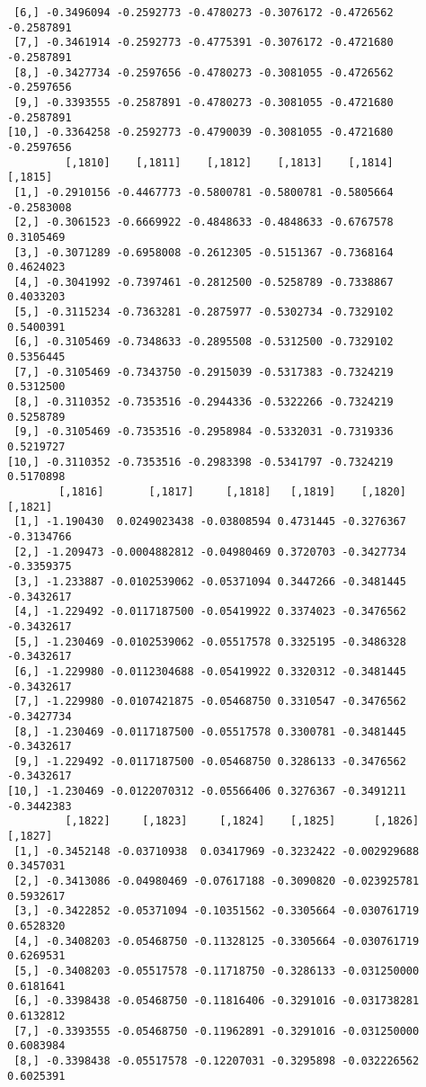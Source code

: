 \documentclass[
  letterpaper,
  DIV=11,
  numbers=noendperiod]{scrreprt}
\begin{document}
\begin{verbatim}
 [6,] -0.3496094 -0.2592773 -0.4780273 -0.3076172 -0.4726562 -0.2587891
 [7,] -0.3461914 -0.2592773 -0.4775391 -0.3076172 -0.4721680 -0.2587891
 [8,] -0.3427734 -0.2597656 -0.4780273 -0.3081055 -0.4726562 -0.2597656
 [9,] -0.3393555 -0.2587891 -0.4780273 -0.3081055 -0.4721680 -0.2587891
[10,] -0.3364258 -0.2592773 -0.4790039 -0.3081055 -0.4721680 -0.2597656
         [,1810]    [,1811]    [,1812]    [,1813]    [,1814]    [,1815]
 [1,] -0.2910156 -0.4467773 -0.5800781 -0.5800781 -0.5805664 -0.2583008
 [2,] -0.3061523 -0.6669922 -0.4848633 -0.4848633 -0.6767578  0.3105469
 [3,] -0.3071289 -0.6958008 -0.2612305 -0.5151367 -0.7368164  0.4624023
 [4,] -0.3041992 -0.7397461 -0.2812500 -0.5258789 -0.7338867  0.4033203
 [5,] -0.3115234 -0.7363281 -0.2875977 -0.5302734 -0.7329102  0.5400391
 [6,] -0.3105469 -0.7348633 -0.2895508 -0.5312500 -0.7329102  0.5356445
 [7,] -0.3105469 -0.7343750 -0.2915039 -0.5317383 -0.7324219  0.5312500
 [8,] -0.3110352 -0.7353516 -0.2944336 -0.5322266 -0.7324219  0.5258789
 [9,] -0.3105469 -0.7353516 -0.2958984 -0.5332031 -0.7319336  0.5219727
[10,] -0.3110352 -0.7353516 -0.2983398 -0.5341797 -0.7324219  0.5170898
        [,1816]       [,1817]     [,1818]   [,1819]    [,1820]    [,1821]
 [1,] -1.190430  0.0249023438 -0.03808594 0.4731445 -0.3276367 -0.3134766
 [2,] -1.209473 -0.0004882812 -0.04980469 0.3720703 -0.3427734 -0.3359375
 [3,] -1.233887 -0.0102539062 -0.05371094 0.3447266 -0.3481445 -0.3432617
 [4,] -1.229492 -0.0117187500 -0.05419922 0.3374023 -0.3476562 -0.3432617
 [5,] -1.230469 -0.0102539062 -0.05517578 0.3325195 -0.3486328 -0.3432617
 [6,] -1.229980 -0.0112304688 -0.05419922 0.3320312 -0.3481445 -0.3432617
 [7,] -1.229980 -0.0107421875 -0.05468750 0.3310547 -0.3476562 -0.3427734
 [8,] -1.230469 -0.0117187500 -0.05517578 0.3300781 -0.3481445 -0.3432617
 [9,] -1.229492 -0.0117187500 -0.05468750 0.3286133 -0.3476562 -0.3432617
[10,] -1.230469 -0.0122070312 -0.05566406 0.3276367 -0.3491211 -0.3442383
         [,1822]     [,1823]     [,1824]    [,1825]      [,1826]   [,1827]
 [1,] -0.3452148 -0.03710938  0.03417969 -0.3232422 -0.002929688 0.3457031
 [2,] -0.3413086 -0.04980469 -0.07617188 -0.3090820 -0.023925781 0.5932617
 [3,] -0.3422852 -0.05371094 -0.10351562 -0.3305664 -0.030761719 0.6528320
 [4,] -0.3408203 -0.05468750 -0.11328125 -0.3305664 -0.030761719 0.6269531
 [5,] -0.3408203 -0.05517578 -0.11718750 -0.3286133 -0.031250000 0.6181641
 [6,] -0.3398438 -0.05468750 -0.11816406 -0.3291016 -0.031738281 0.6132812
 [7,] -0.3393555 -0.05468750 -0.11962891 -0.3291016 -0.031250000 0.6083984
 [8,] -0.3398438 -0.05517578 -0.12207031 -0.3295898 -0.032226562 0.6025391

\end{verbatim}
\end{document}
